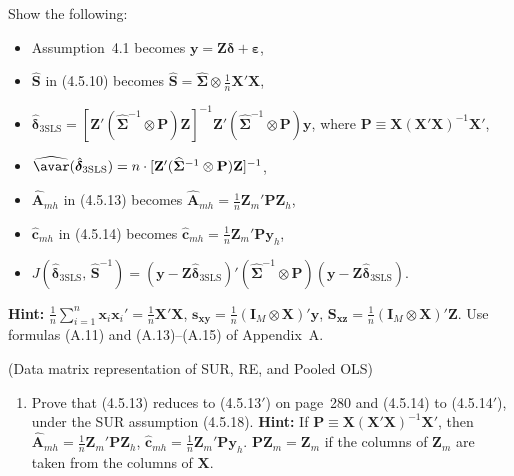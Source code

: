 \begin{problemset}
Show the following:
\begin{itemize}
\item Assumption~4.1 becomes $\mathbf{y} = \mathbf{Z}\boldsymbol{\delta} + \boldsymbol{\varepsilon}$,
\item $\widehat{\mathbf{S}}$ in (4.5.10) becomes
$\widehat{\mathbf{S}} = \widehat{\boldsymbol{\Sigma}} \otimes \frac{1}{n} \mathbf{X}'\mathbf{X}$,
\item $\hat{\boldsymbol{\delta}}_{\mathrm{3SLS}}
= [\mathbf{Z}'(\widehat{\boldsymbol{\Sigma}}^{-1} \otimes \mathbf{P})\mathbf{Z}]^{-1}
\mathbf{Z}'(\widehat{\boldsymbol{\Sigma}}^{-1} \otimes \mathbf{P})\mathbf{y}$,
where $\mathbf{P} \equiv \mathbf{X}(\mathbf{X}'\mathbf{X})^{-1}\mathbf{X}'$,
\item $\widehat{\avar}(\hat{\boldsymbol{\delta}}_{\mathrm{3SLS}})
= n \cdot [\mathbf{Z}'(\widehat{\boldsymbol{\Sigma}}^{-1} \otimes \mathbf{P})\mathbf{Z}]^{-1}$,
\item $\widehat{\mathbf{A}}_{mh}$ in (4.5.13) becomes
$\widehat{\mathbf{A}}_{mh} = \frac{1}{n} \mathbf{Z}_m' \mathbf{P} \mathbf{Z}_h$,
\item $\hat{\mathbf{c}}_{mh}$ in (4.5.14) becomes
$\hat{\mathbf{c}}_{mh} = \frac{1}{n} \mathbf{Z}_m' \mathbf{P} \mathbf{y}_h$,
\item $J(\hat{\boldsymbol{\delta}}_{\mathrm{3SLS}},\, \widehat{\mathbf{S}}^{-1})
= (\mathbf{y} - \mathbf{Z}\hat{\boldsymbol{\delta}}_{\mathrm{3SLS}})'
(\widehat{\boldsymbol{\Sigma}}^{-1} \otimes \mathbf{P})
(\mathbf{y} - \mathbf{Z}\hat{\boldsymbol{\delta}}_{\mathrm{3SLS}})$.
\end{itemize}

\textbf{Hint:}
$\frac{1}{n} \sum_{i=1}^{n} \mathbf{x}_i \mathbf{x}_i' = \frac{1}{n} \mathbf{X}'\mathbf{X}$,
\quad $\mathbf{s}_{\mathbf{xy}} = \frac{1}{n}(\mathbf{I}_M \otimes \mathbf{X})'\mathbf{y}$,
\quad $\mathbf{S}_{\mathbf{xz}} = \frac{1}{n}(\mathbf{I}_M \otimes \mathbf{X})'\mathbf{Z}$.
Use formulas (A.11) and (A.13)--(A.15) of Appendix~A.

\exercise[2]
(Data matrix representation of SUR, RE, and Pooled OLS)
\begin{enumerate}[label=(\alph*)]
\item Prove that (4.5.13) reduces to (4.5.13$'$) on page~280 and (4.5.14) to
(4.5.14$'$), under the SUR assumption (4.5.18).
\textbf{Hint:} If $\mathbf{P} \equiv \mathbf{X}(\mathbf{X}'\mathbf{X})^{-1}\mathbf{X}'$,
then $\widehat{\mathbf{A}}_{mh} = \frac{1}{n} \mathbf{Z}_m' \mathbf{P} \mathbf{Z}_h$,
$\hat{\mathbf{c}}_{mh} = \frac{1}{n} \mathbf{Z}_m' \mathbf{P} \mathbf{y}_h$.
$\mathbf{P}\mathbf{Z}_m = \mathbf{Z}_m$ if the columns of $\mathbf{Z}_m$
are taken from the columns of $\mathbf{X}$.


\end{enumerate}
\end{problemset}
